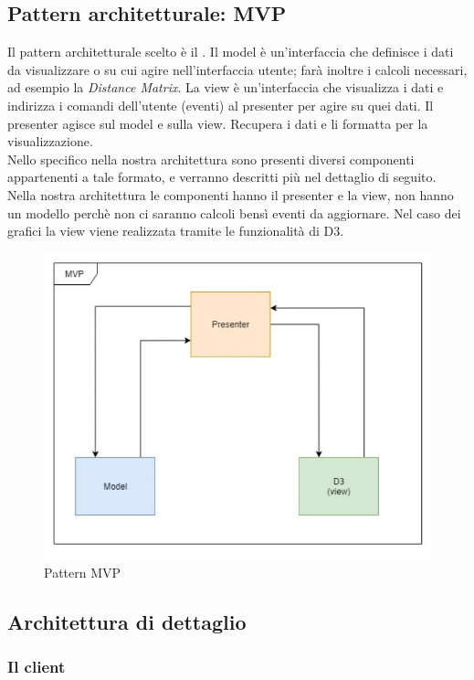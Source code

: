 \documentclass[../manuale_sviluppatore.tex]{subfiles}
\begin{document}
\subsection{Pattern architetturale: MVP}
Il pattern architetturale scelto è il . 
Il model è un'interfaccia che definisce i dati da visualizzare o su cui agire nell'interfaccia utente; farà inoltre i calcoli necessari, ad esempio la \emph{Distance Matrix}.
La view è un'interfaccia che visualizza i dati e indirizza i comandi dell'utente (eventi) al presenter per agire su quei dati.
Il presenter agisce sul model e sulla view. Recupera i dati e li formatta per la visualizzazione.\\
Nello specifico nella nostra architettura sono presenti diversi componenti appartenenti a tale formato, e verranno descritti più nel dettaglio di seguito.\\
Nella nostra architettura le componenti hanno il presenter e la view, non hanno un modello perchè non ci saranno calcoli bensì eventi da aggiornare. Nel caso dei
grafici la view viene realizzata tramite le funzionalità di D3.

\begin{figure}[H]
	\centering
	\includegraphics[width=18cm]{img/patternMVP.jpg}
	\caption{Pattern MVP}
\end{figure}

\subsection{Architettura di dettaglio}
\subsubsection{Il client}
\end{document}

